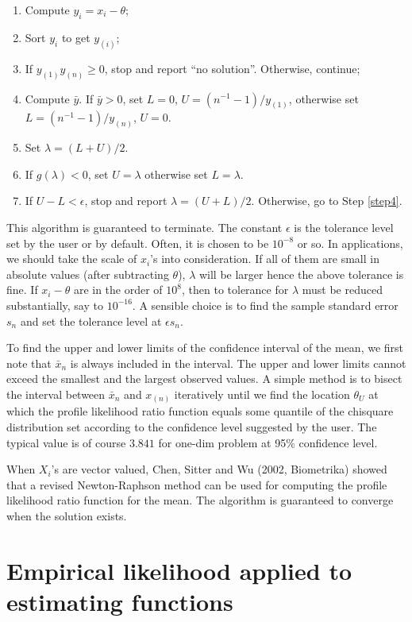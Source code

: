 \begin{enumerate}
\item
Compute $y_i = x_i - \theta$;
\item
Sort $y_i$ to get $y_{(i)}$;
\item
If $y_{(1)}y_{(n)} \geq 0$, stop and report ``no solution''. Otherwise, continue;
\item
Compute $\bar y$. If $\bar y > 0$, set $L = 0$, $U = (n^{-1} - 1)/y_{(1)}$, otherwise
set $L = (n^{-1} -1)/y_{(n)}$, $U = 0$.
\item
\label{step4}
Set $\lambda = (L+U)/2$. 
\item
If $g(\lambda) < 0$, set $U = \lambda$ otherwise set $L= \lambda$.
\item
If $U - L < \epsilon$, stop and report $\lambda = (U+L)/2$. Otherwise, go to
Step \ref{step4}.
\end{enumerate}

\vs
This algorithm is guaranteed to terminate. 
The constant $\epsilon$ is the tolerance level set by the user or by default. 
Often, it is chosen to be $10^{-8}$ or so. In applications, 
we should take the scale of $x_i$'s into consideration. 
If all of them are small in absolute values (after subtracting $\theta$), 
$\lambda$ will be larger hence the above tolerance is fine. 
If $x_i - \theta$ are in the order of $10^8$, then to 
tolerance for $\lambda$ must be reduced substantially, say to $10^{-16}$.
A sensible choice is to find the sample standard error $s_n$ and set the
tolerance level at $\epsilon s_n$.

To find the upper and lower limits of the confidence interval of the mean, 
we first note that $\bar x_n$ is always included in the interval. 
The upper and lower limits cannot exceed the smallest and the largest observed values. 
A simple method is to bisect the interval between $\bar x_n$ and $x_{(n)}$ iteratively 
until we find the location $\theta_U$ at which the profile likelihood ratio function equals some
quantile of the chisquare distribution set according to the confidence level suggested by the user.
The typical value is of course $3.841$ for one-dim problem at 95\% confidence level.

When $X_i$'s are vector valued, Chen, Sitter and Wu (2002, Biometrika) 
showed that a revised Newton-Raphson method can be used 
for computing the profile likelihood ratio function for the mean. 
The algorithm is guaranteed to converge when the solution exists. 

\section{Empirical likelihood applied to estimating functions}

